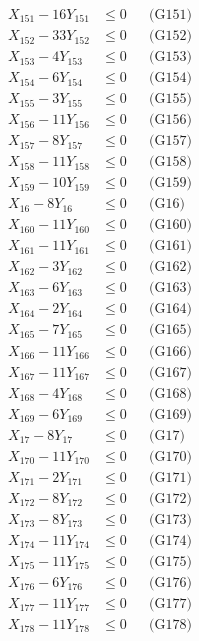 \documentclass[a4paper,10pt]{article}
\begin{document}
{\begin{align}
X_{151} - 16Y_{151} &\leq 0 && \text{(G151)} \\
\allowbreak
X_{152} - 33Y_{152} &\leq 0 && \text{(G152)} \\
X_{153} - 4Y_{153} &\leq 0 && \text{(G153)} \\
X_{154} - 6Y_{154} &\leq 0 && \text{(G154)} \\
X_{155} - 3Y_{155} &\leq 0 && \text{(G155)} \\
X_{156} - 11Y_{156} &\leq 0 && \text{(G156)} \\
X_{157} - 8Y_{157} &\leq 0 && \text{(G157)} \\
X_{158} - 11Y_{158} &\leq 0 && \text{(G158)} \\
X_{159} - 10Y_{159} &\leq 0 && \text{(G159)} \\
X_{16} - 8Y_{16} &\leq 0 && \text{(G16)} \\
X_{160} - 11Y_{160} &\leq 0 && \text{(G160)} \\
X_{161} - 11Y_{161} &\leq 0 && \text{(G161)} \\
X_{162} - 3Y_{162} &\leq 0 && \text{(G162)} \\
X_{163} - 6Y_{163} &\leq 0 && \text{(G163)} \\
X_{164} - 2Y_{164} &\leq 0 && \text{(G164)} \\
X_{165} - 7Y_{165} &\leq 0 && \text{(G165)} \\
X_{166} - 11Y_{166} &\leq 0 && \text{(G166)} \\
X_{167} - 11Y_{167} &\leq 0 && \text{(G167)} \\
X_{168} - 4Y_{168} &\leq 0 && \text{(G168)} \\
X_{169} - 6Y_{169} &\leq 0 && \text{(G169)} \\
X_{17} - 8Y_{17} &\leq 0 && \text{(G17)} \\
\allowbreak
X_{170} - 11Y_{170} &\leq 0 && \text{(G170)} \\
X_{171} - 2Y_{171} &\leq 0 && \text{(G171)} \\
X_{172} - 8Y_{172} &\leq 0 && \text{(G172)} \\
X_{173} - 8Y_{173} &\leq 0 && \text{(G173)} \\
X_{174} - 11Y_{174} &\leq 0 && \text{(G174)} \\
X_{175} - 11Y_{175} &\leq 0 && \text{(G175)} \\
X_{176} - 6Y_{176} &\leq 0 && \text{(G176)} \\
X_{177} - 11Y_{177} &\leq 0 && \text{(G177)} \\
X_{178} - 11Y_{178} &\leq 0 && \text{(G178)} \\

\end{align}}
\end{document}
